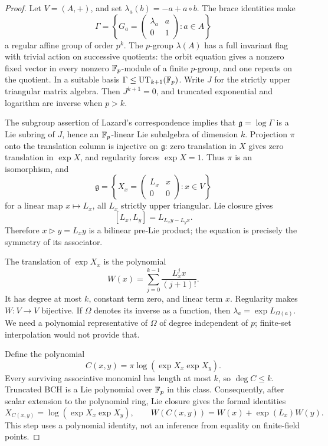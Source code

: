 \begin{proof}
Let \(V=(A,+)\), and set \(\lambda_a(b)=-a+a\circ b\).
The brace identities make
\[
 \Gamma=\left\{
 G_a=\begin{pmatrix}\lambda_a&a\\0&1\end{pmatrix}:a\in A
 \right\}
\]
a regular affine group of order \(p^k\). The \(p\)-group \(\lambda(A)\)
has a full invariant flag with trivial action on successive quotients:
the orbit equation gives a nonzero fixed vector in every nonzero
\(\mathbb F_p\)-module of a finite \(p\)-group, and one repeats on the quotient.
In a suitable basis \(\Gamma\le\mathrm{UT}_{k+1}(\mathbb F_p)\).
Write \(J\) for the strictly upper triangular matrix algebra.
Then \(J^{k+1}=0\), and truncated exponential and logarithm are inverse
when \(p>k\).

The subgroup assertion of Lazard's correspondence
\cite[pp.~178--180]{lazard} implies that
\(\mathfrak g=\log\Gamma\) is a Lie subring of \(J\), hence an
\(\mathbb F_p\)-linear Lie subalgebra of dimension \(k\).
Projection \(\pi\) onto the translation column is injective on
\(\mathfrak g\): zero translation in \(X\) gives zero translation in
\(\exp X\), and regularity forces \(\exp X=1\). Thus \(\pi\) is an
isomorphism, and
\[
 \mathfrak g=\left\{
 X_x=\begin{pmatrix}L_x&x\\0&0\end{pmatrix}:x\in V
 \right\}
\]
for a linear map \(x\mapsto L_x\), all \(L_x\) strictly upper triangular.
Lie closure gives
\[
 [L_x,L_y]=L_{L_xy-L_yx}.
\]
Therefore \(x\mathbin{\triangleright}y=L_xy\) is a bilinear pre-Lie
product; the equation is precisely the symmetry of its associator.

The translation of \(\exp X_x\) is the polynomial
\[
 W(x)=\sum_{j=0}^{k-1}\frac{L_x^jx}{(j+1)!}.
\]
It has degree at most \(k\), constant term zero, and linear term \(x\).
Regularity makes \(W:V\to V\) bijective. If \(\Omega\) denotes its inverse
as a function, then \(\lambda_a=\exp L_{\Omega(a)}\).
We need a polynomial representative of \(\Omega\) of degree independent
of \(p\); finite-set interpolation would not provide that.

Define the polynomial
\[
 C(x,y)=\pi\log(\exp X_x\exp X_y).
\]
Every surviving associative monomial has length at most \(k\), so
\(\deg C\le k\). Truncated BCH is a Lie polynomial over \(\mathbb F_p\)
in this class. Consequently, after scalar extension to the polynomial
ring, Lie closure gives the formal identities
\[
 X_{C(x,y)}=\log(\exp X_x\exp X_y),\qquad
 W(C(x,y))=W(x)+\exp(L_x)W(y).                 \tag{*}
\]
This step uses a polynomial identity, not an inference from equality
on finite-field points.


\end{proof}
